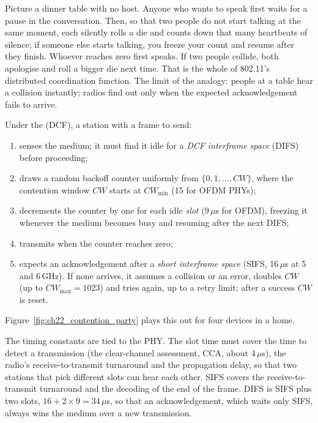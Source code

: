 
\begin{analogy}
Picture a dinner table with no host. Anyone who wants to speak first waits for a pause in the
conversation. Then, so that two people do not start talking at the same moment, each silently rolls
a die and counts down that many heartbeats of silence; if someone else starts talking, you freeze
your count and resume after they finish. Whoever reaches zero first speaks. If two people collide,
both apologise and roll a bigger die next time. That is the whole of 802.11's distributed
coordination function. The limit of the analogy: people at a table hear a collision instantly;
radios find out only when the expected acknowledgement fails to arrive.
\end{analogy}

Under the  (DCF), a station with a frame to send:
\begin{enumerate}
\item senses the medium; it must find it idle for a \emph{DCF interframe space} (DIFS) before
proceeding;
\item draws a random backoff counter uniformly from $\{0,1,\dots,CW\}$, where the contention window
$CW$ starts at $CW_{\min}$ (15 for OFDM PHYs);
\item decrements the counter by one for each idle \emph{slot} (9\,$\mu$s for OFDM), freezing it
whenever the medium becomes busy and resuming after the next DIFS;
\item transmits when the counter reaches zero;
\item expects an acknowledgement after a \emph{short interframe space} (SIFS, 16\,$\mu$s at 5 and
6\,GHz). If none arrives, it assumes a collision or an error, doubles $CW$ (up to $CW_{\max}=1023$)
and tries again, up to a retry limit; after a success $CW$ is reset.
\end{enumerate}
Figure~\ref{fig:ch22_contention_party} plays this out for four devices in a home.

The timing constants are tied to the PHY. The slot time must cover the time to detect a transmission
(the clear-channel assessment, CCA, about 4\,$\mu$s), the radio's receive-to-transmit turnaround and
the propagation delay, so that two stations that pick different slots can hear each other. SIFS
covers the receive-to-transmit turnaround and the decoding of the end of the frame. DIFS is SIFS
plus two slots, $16+2\times9=34\,\mu$s, so that an acknowledgement, which waits only SIFS, always wins
the medium over a new transmission.

